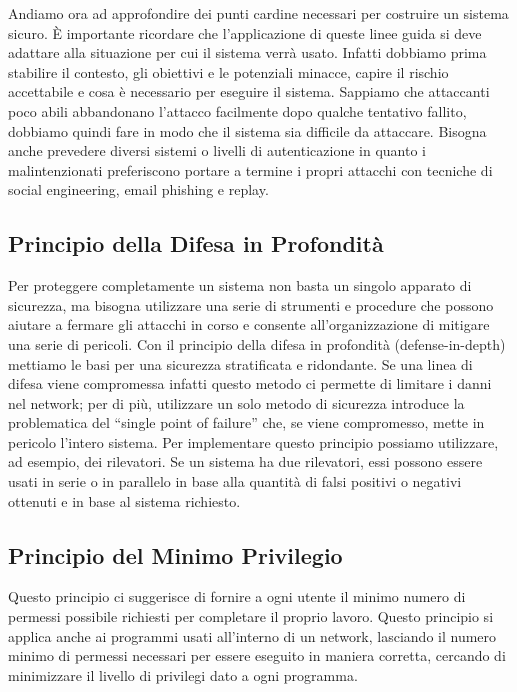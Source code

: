             Andiamo ora ad approfondire dei punti cardine necessari per costruire un sistema sicuro. È importante ricordare che l'applicazione di queste linee guida si deve adattare alla situazione per cui il sistema verrà usato. 
            Infatti dobbiamo prima stabilire il contesto, gli obiettivi e le potenziali minacce, capire il rischio accettabile e cosa è necessario per eseguire il sistema. Sappiamo che attaccanti poco abili abbandonano l'attacco facilmente dopo qualche tentativo fallito, dobbiamo quindi fare in modo che il sistema 
            sia difficile da attaccare. Bisogna anche prevedere diversi sistemi o livelli di autenticazione in quanto i malintenzionati preferiscono portare a termine i propri attacchi con tecniche di social engineering, email phishing e replay.
            
        
        \subsection{Principio della Difesa in Profondità}
            Per proteggere completamente un sistema non basta un singolo apparato di sicurezza, ma bisogna utilizzare una serie di strumenti e procedure che possono aiutare a fermare gli attacchi in corso e consente all'organizzazione di mitigare una 
            serie di pericoli. 
            Con il principio della difesa in profondità (defense-in-depth) mettiamo le basi per una sicurezza stratificata e ridondante. Se una linea di difesa viene compromessa infatti questo metodo ci permette di limitare i danni nel network; per di più, utilizzare un solo metodo di sicurezza introduce la problematica del “single point of failure” che, se viene compromesso, mette in
            pericolo l'intero sistema. Per implementare questo principio possiamo utilizzare, ad esempio, dei rilevatori. Se un sistema ha due rilevatori, essi possono essere usati in serie o in parallelo in base alla quantità di falsi positivi o negativi ottenuti e in base al sistema richiesto.
        
    
        \vspace{5mm}
            
        \subsection{Principio del Minimo Privilegio}
            Questo principio ci suggerisce di fornire a ogni utente il minimo numero di permessi possibile richiesti per completare il proprio lavoro. Questo principio si applica anche ai programmi usati all'interno di un network, lasciando il numero minimo di permessi necessari per essere eseguito in maniera corretta,
            cercando di minimizzare il livello di privilegi dato a ogni programma.
            

